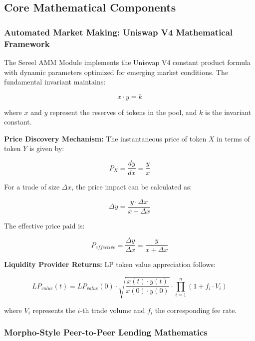 \documentclass[12pt]{article}
\begin{document}
\subsection{Core Mathematical Components}

\subsubsection{Automated Market Making: Uniswap V4 Mathematical Framework}

The Sereel AMM Module implements the Uniswap V4 constant product formula with dynamic parameters optimized for emerging market conditions. The fundamental invariant maintains:

\begin{equation}
x \cdot y = k
\end{equation}

where $x$ and $y$ represent the reserves of tokens in the pool, and $k$ is the invariant constant.

\textbf{Price Discovery Mechanism:}
The instantaneous price of token $X$ in terms of token $Y$ is given by:

\begin{equation}
P_X = \frac{dy}{dx} = \frac{y}{x}
\end{equation}

For a trade of size $\Delta x$, the price impact can be calculated as:

\begin{equation}
\Delta y = \frac{y \cdot \Delta x}{x + \Delta x}
\end{equation}

The effective price paid is:

\begin{equation}
P_{effective} = \frac{\Delta y}{\Delta x} = \frac{y}{x + \Delta x}
\end{equation}

\textbf{Liquidity Provider Returns:}
LP token value appreciation follows:

\begin{equation}
LP_{value}(t) = LP_{value}(0) \cdot \sqrt{\frac{x(t) \cdot y(t)}{x(0) \cdot y(0)}} \cdot \prod_{i=1}^{n} (1 + f_i \cdot V_i)
\end{equation}

where $V_i$ represents the $i$-th trade volume and $f_i$ the corresponding fee rate.

\subsubsection{Morpho-Style Peer-to-Peer Lending Mathematics}
\end{document}
